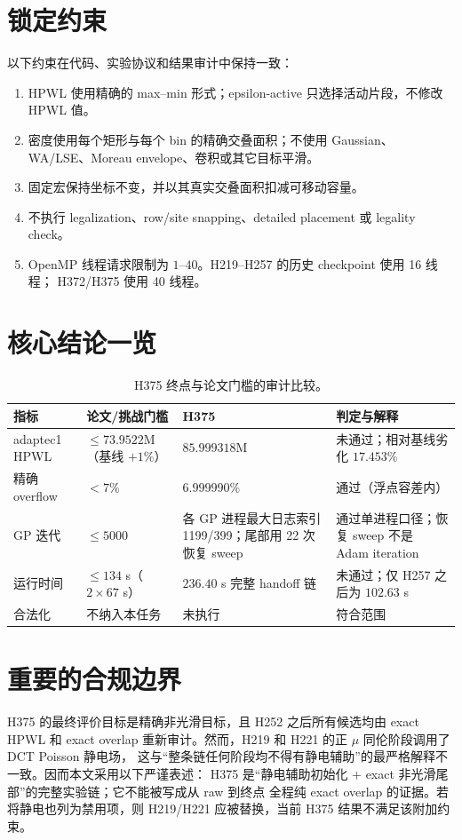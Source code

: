 \documentclass[UTF8,a4paper,11pt]{ctexrep}
\begin{document}
\section{锁定约束}
以下约束在代码、实验协议和结果审计中保持一致：
\begin{enumerate}
  \item HPWL 使用精确的 max--min 形式；epsilon-active 只选择活动片段，不修改 HPWL 值。
  \item 密度使用每个矩形与每个 bin 的精确交叠面积；不使用 Gaussian、WA/LSE、Moreau
        envelope、卷积或其它目标平滑。
  \item 固定宏保持坐标不变，并以其真实交叠面积扣减可移动容量。
  \item 不执行 legalization、row/site snapping、detailed placement 或 legality check。
  \item OpenMP 线程请求限制为 $1$--$40$。H219--H257 的历史 checkpoint 使用 16 线程；
        H372/H375 使用 40 线程。
\end{enumerate}

\section{核心结论一览}
\begin{table}[H]
\centering
\caption{H375 终点与论文门槛的审计比较。}
\label{tab:gate}
\small
\begin{tabularx}{\textwidth}{>{\raggedright\arraybackslash}p{2.65cm} >{\raggedright\arraybackslash}p{2.75cm} >{\raggedright\arraybackslash}p{2.75cm} >{\raggedright\arraybackslash}X}
\toprule
指标 & 论文/挑战门槛 & H375 & 判定与解释\\
\midrule
adaptec1 HPWL & $\le 73.9522$M（基线 $+1\%$） & $85.999318$M & 未通过；相对基线劣化 $17.453\%$\\
精确 overflow & $<7\%$ & $6.999990\%$ & 通过（浮点容差内）\\
GP 迭代 & $\le 5000$ & 各 GP 进程最大日志索引 1199/399；尾部用 22 次恢复 sweep & 通过单进程口径；恢复 sweep 不是 Adam iteration\\
运行时间 & $\le 134$ s（$2\times67$ s） & $236.40$ s 完整 handoff 链 & 未通过；仅 H257 之后为 $102.63$ s\\
合法化 & 不纳入本任务 & 未执行 & 符合范围\\
\bottomrule
\end{tabularx}
\end{table}

\section{重要的合规边界}
H375 的最终评价目标是精确非光滑目标，且 H252 之后所有候选均由 exact HPWL 和 exact
overlap 重新审计。然而，H219 和 H221 的正 $\mu$ 同伦阶段调用了 DCT Poisson 静电场，
这与“整条链任何阶段均不得有静电辅助”的最严格解释不一致。因而本文采用以下严谨表述：
H375 是“静电辅助初始化 + exact 非光滑尾部”的完整实验链；它不能被写成从 raw 到终点
全程纯 exact overlap 的证据。若将静电也列为禁用项，则 H219/H221 应被替换，当前 H375
结果不满足该附加约束。
\end{document}
